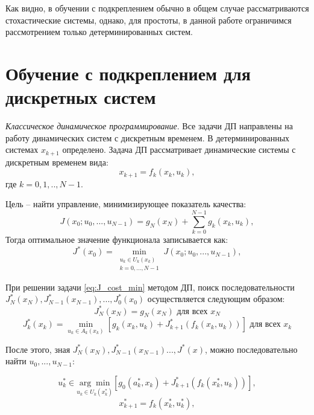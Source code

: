 Как видно, в обучении с подкреплением обычно в общем случае рассматриваются стохастические системы, однако, для простоты, в данной работе ограничимся рассмотрением только детерминированных систем.

\section{Обучение с подкреплением для дискретных систем}

\textit{Классическое динамическое программирование}. Все задачи ДП направлены на работу динамических систем с дискретным временем. В детерминированных системах \(x_{k+1}\) определено. 
Задача ДП рассматривает динамические системы с дискретным временем вида:
\begin{equation}
x_{k+1} = f_k(x_k, u_k),
\end{equation}
где $k=0, 1,.., N-1$.

Цель -- найти управление, минимизирующее показатель качества:
\begin{equation}
\label{eq:J_cost}
J(x_0;u_0,...,u_{N-1}) = g_N(x_N) + \sum_{k=0}^{N-1} g_k(x_k, u_k),
\end{equation}
Тогда оптимальное значение функционала записывается как:
%
\begin{equation}
\label{eq:J_cost_min}
J^*(x_0) = \min_{\substack{u_k \in U_k(x_k) \\ k=0,...,N-1}} J(x_0;u_0,...,u_{N-1}),
\end{equation}

При решении задачи \eqref{eq:J_cost_min} методом ДП, поиск последовательности $J^*_N(x_N), J^*_{N-1}(x_{N-1}),..., J^*_0(x_0)$ осуществляется следующим образом:
\begin{equation*}
	J^*_N(x_N) = g_N(x_N) \text{ для всех }x_N
\end{equation*}
\begin{equation*}
	J^*_k(x_k) = \min_{u_k \in A_k(x_k)} [g_k(x_k, u_k) + J^*_{k+1}(f_k(x_k, u_k))] \text{ для всех } x_k
\end{equation*}

После этого, зная $J^*_{N}(x_{N}), J^*_{N-1}(x_{N-1})..., J^*(x)$, можно последовательно найти $u_0, ..., u_{N-1}$:


\begin{equation*}
	u^{*}_k \in \underset{u_k \in U_k(x^*_k)}{\arg \min}[g_0(a^*_k, x_k) + J^*_{k+1}(f_k(x^*_k, u_k))],
\end{equation*}
\begin{equation*}
	x^*_{k+1} = f_k(x^*_k, u^*_k),
\end{equation*}

